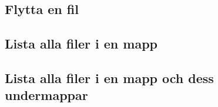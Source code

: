 \hypertarget{flytta-en-fil}{%
\subsection{Flytta en fil}\label{flytta-en-fil}}

\hypertarget{cb14}{}
\begin{Shaded}
\begin{Highlighting}[]
\OperatorTok{=}  \OperatorTok{(}\OperatorTok{);}
\OperatorTok{(}\OperatorTok{())\{}
\OperatorTok{(} \OperatorTok{(}\OperatorTok{));}
\OperatorTok{\}}
\end{Highlighting}
\end{Shaded}

\hypertarget{lista-alla-filer-i-en-mapp}{%
\subsection{Lista alla filer i en
mapp}\label{lista-alla-filer-i-en-mapp}}

\hypertarget{cb15}{}
\begin{Shaded}
\begin{Highlighting}[]
\OperatorTok{=}  \OperatorTok{(}\OperatorTok{);}
\OperatorTok{(}\OperatorTok{())\{}
    \OperatorTok{[]}\OperatorTok{=}\OperatorTok{();}
    \OperatorTok{(}\OperatorTok{:}\OperatorTok{)\{}
        \OperatorTok{(}\OperatorTok{());}
    \OperatorTok{\}}
\OperatorTok{\}}
\end{Highlighting}
\end{Shaded}

\hypertarget{lista-alla-filer-i-en-mapp-och-dess-undermappar}{%
\subsection{Lista alla filer i en mapp och dess
undermappar}\label{lista-alla-filer-i-en-mapp-och-dess-undermappar}}

